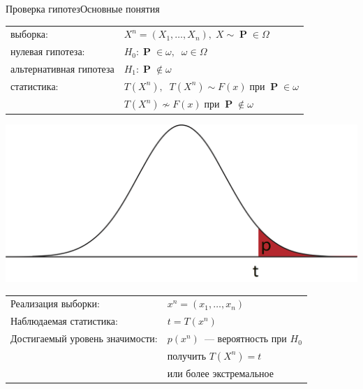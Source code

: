 \documentclass[11pt,pdf,utf8,hyperref={unicode},aspectratio=169]{beamer}
\DeclareMathOperator{\prob}{\mathbf{P}}
\begin{document}
\begin{frame}{Проверка гипотез}{Основные понятия}
\begin{minipage}{0.20\textwidth}
    \end{minipage}
    \begin{minipage}{0.79\textwidth}
    	\begin{tabular}{ll}
            выборка:                        & $X^n=\left(X_1,\ldots,X_n\right), \; X \sim \prob \in \Omega$         \\
            нулевая гипотеза:               & $H_0\colon \prob\in\omega, \;\; \omega\in\Omega$ \\
            альтернативная гипотеза         & $H_1\colon \prob\notin\omega$ \\
            статистика:                     & $T\left(X^n\right), \;\; T\left(X^n\right)\sim F\left(x\right) \;\text{при}\; \prob\in\omega$ \\
            & \;\;\;\;\;\;\;\;\;\;\;\;\;\; $T\left(X^n\right)\not\sim F\left(x\right) \;\text{при}\; \prob\notin\omega$ \\
        \end{tabular}
    \end{minipage}

    \bigskip

    \begin{minipage}{0.20\textwidth}
        \includegraphics[width=1\textwidth]{stats2.png}
    \end{minipage}
    \begin{minipage}{0.79\textwidth}
        \begin{tabular}{ll}
    	   Реализация выборки:             & $x^n=\left(x_1,\ldots,x_n\right)$ \\
            Наблюдаемая статистика:          & $t = T \left(x^n\right)$ \\
            Достигаемый уровень значимости:
            & $p\left(x^n\right)$~--- вероятность при $H_0$\\
            & получить $T \left(X^n\right)=t$\\
            & или более экстремальное\\
        \end{tabular}
    \end{minipage}


\end{frame}
\end{document}
